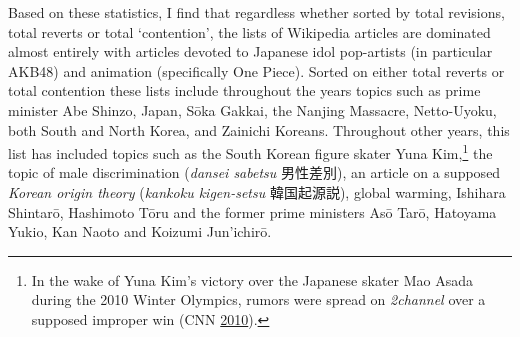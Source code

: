 \documentclass[10pt,british,A4paper,,openany]{memoir}
\begin{document}
\begin{table}[!htb]
\footnotesize
\centering
\setlength{\tabcolsep}{5pt}
\caption{50 most contentious articles on the Japanese Wikipedia (2019)}\label{tab:50mostcont}
\end{table}

Based on these statistics, I find that regardless whether sorted by
total revisions, total reverts or total `contention', the lists of
Wikipedia articles are dominated almost entirely with articles devoted
to Japanese idol pop-artists (in particular AKB48) and animation
(specifically One Piece). Sorted on either total reverts or total
contention these lists include throughout the years topics such as prime
minister Abe Shinzo, Japan, Sōka Gakkai, the Nanjing Massacre,
Netto-Uyoku, both South and North Korea, and Zainichi Koreans.
Throughout other years, this list has included topics such as the South
Korean figure skater Yuna Kim,\footnote{In the wake of Yuna Kim's
  victory over the Japanese skater Mao Asada during the 2010 Winter
  Olympics, rumors were spread on \emph{2channel} over a supposed
  improper win (CNN \protect\hyperlink{ref-cnn_korean_2010}{2010}).} the
topic of male discrimination (\emph{dansei sabetsu} 男性差別), an
article on a supposed \emph{Korean origin theory} (\emph{kankoku
kigen-setsu} 韓国起源説), global warming, Ishihara Shintarō, Hashimoto
Tōru and the former prime ministers Asō Tarō, Hatoyama Yukio, Kan Naoto
and Koizumi Jun'ichirō.
\end{document}
